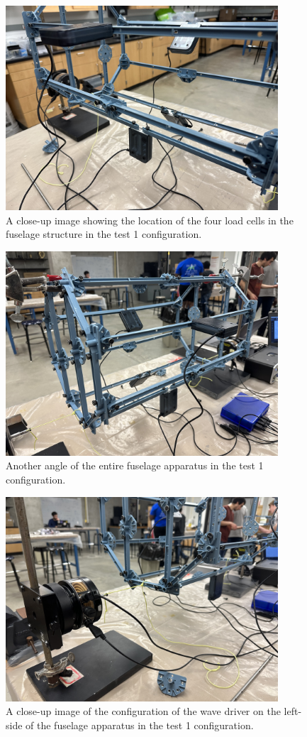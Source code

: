 \documentclass[12 pt]{report}
\begin{document}
\begin{figure}[htbp]
	\centering
	\includegraphics[width=4in]{images/IMG_1313}
	\caption{A close-up image showing the location of the four load cells in the fuselage structure in the test \num{1} configuration.}
	\label{fig:test1_app_2}
\end{figure}

\begin{figure}[htbp]
	\centering
	\includegraphics[width=4in]{images/IMG_1314}
	\caption{Another angle of the entire fuselage apparatus in the test \num{1} configuration.}
	\label{fig:test1_app_3}
\end{figure}

\begin{figure}[htbp]
	\centering
	\includegraphics[width=4in]{images/IMG_1315}
	\caption{A close-up image of the configuration of the wave driver on the left-side of the fuselage apparatus in the test \num{1} configuration.}
	\label{fig:test1_app_4}
\end{figure}
\end{document}
